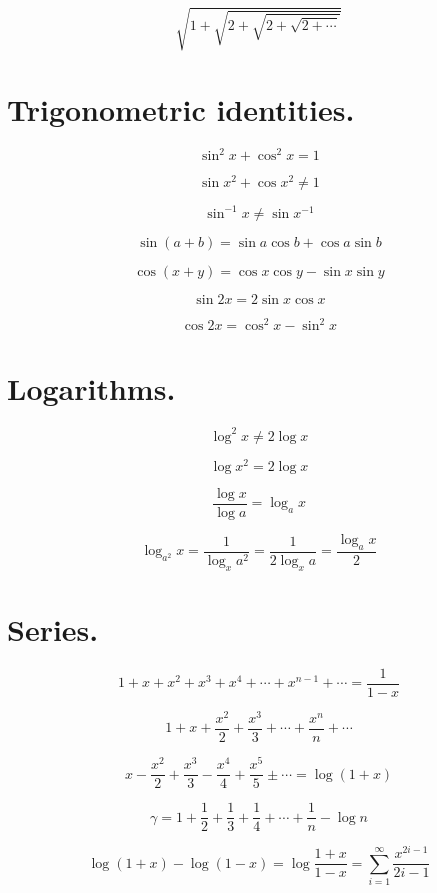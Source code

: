 $$\sqrt{1+\sqrt{2+\sqrt{2+\sqrt {2+\cdots }}}}$$



\section{Trigonometric identities. }

$$\sin^2x+\cos^2x=1$$

$$\sin x^2 + \cos x^2 \neq 1 $$

$$\sin^{-1}x \neq \sin x^{-1}$$

$$\sin (a+b) = \sin a \cos b + \cos a \sin b$$

$$\cos (x+y)=\cos x \cos y - \sin x \sin y$$

$$\sin 2x = 2 \sin x \cos x $$

$$\cos 2x = \cos^2 x -\sin^2 x$$



\section{Logarithms. }

$$\log^2x\neq2\log x$$

$$\log x^2=2\log x$$

$$\frac{\log x}{\log a} = \log_a x$$

$$\log_{a^2} x = \frac{1}{\log_x a^2}= \frac{1}{2\log_x a} =
\frac{\log_a x}{2}$$ 



\section{Series. }

$$1+x+x^2+x^3+x^4+\cdots+x^{n-1}+\cdots  = \frac{1}{1-x}$$

$$1+x+\frac{x^2}{2}+\frac{x^3}{3}+\cdots +\frac{x^n}{n}+\cdots$$

$$  x - \frac{x^2}{2} +\frac{x^3}{3}
-\frac{x^4}{4}+\frac{x^5}{5} \pm \cdots  = \log(1+x)$$

$$\gamma = 1+\frac{1}{2}+\frac{1}{3} +\frac{1}{4} +\cdots +\frac{1}{n}
-\log n $$

$$\log (1+x) - \log (1-x) = \log \frac{1+x}{1-x} = \sum_{i=1}^\infty
\frac{x^{2i-1}}{2i -1}$$

